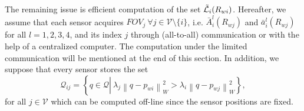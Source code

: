 \documentclass[conference,letterpaper]{ieeeconf}
\newcommand{\V}{{\mathcal V}}
\newcommand{\Q}{{\mathcal Q}}
\newcommand{\ewi}{R_{wi}}
\renewcommand{\L}{{\cal L}}
\begin{document}
The remaining issue is efficient computation of the set $\tilde \L_i(\ewi)$.
Hereafter, we assume that each sensor acquires $FOV_j\ {\forall j}\in \V\setminus \{i\}$,
i.e. $\bar A_i^l(R_{wj})$ and $\bar a_i^l(R_{wj})$ for all $l=1,2,3,4$,
and its index $j$
through (all-to-all) communication or with the help of a centralized computer.
The computation under the limited communication will be
mentioned at the end of this section.
In addition, we suppose that every sensor stores the set
\begin{equation}
\Q_{ij} = \left\{q \in \Q\left|\ \lambda_j\left\|q - 
p_{wi}
\right\|_W^2
>
\lambda_i \left\|q - 
p_{wj}
\right\|_W^2
\right.\right\},
\label{eqn:3Dvoronoi}
\end{equation}
for all $j\in \V$ which can be computed off-line
since the sensor positions are fixed.
\end{document}
